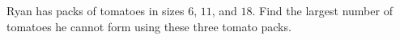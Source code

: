 Ryan has packs of tomatoes in sizes $6$, $11$, and $18$. Find the largest number of tomatoes he cannot form using these three tomato packs.
